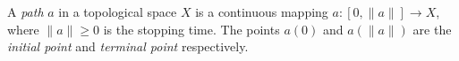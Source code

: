A \textit{path} $a$ in a topological space $X$ is a continuous mapping $a: [0, \|a\|] \to X$, where $\|a\| \geq 0$ is the stopping time. The points $a(0)$ and $a(\|a\|)$ are the \textit{initial point} and \textit{terminal point} respectively.
